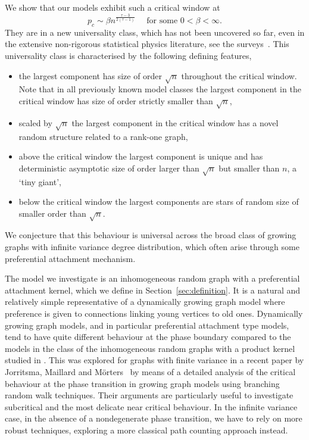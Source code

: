 \documentclass[12pt,a4paper]{article}
\numberwithin{equation}{section}
\begin{document}
We show that our models exhibit such a critical window at 
$$p_c \sim \beta n^{\frac{\tau-3}{2(\tau-1)}} \quad\text{ for some $0<\beta<\infty$.}$$ 
They are in a new %
universality class, which has not been uncovered so far, 
even in the extensive non-rigorous statistical physics literature, see the surveys~\cite{DoGo07, Li}. This universality class is characterised by the following defining features,
\begin{itemize}
    \item the largest component has size of order $\sqrt{n}$ throughout the critical window. Note that in all previously known model classes the largest component in the critical window has size of order strictly smaller than $\sqrt{n}$,
    \item scaled by $\sqrt{n}$ the largest component in the critical window has a novel random structure related to a 
    rank-one graph,
    \item above the critical window the largest component is unique and has deterministic asymptotic size of order 
    larger than $\sqrt{n}$ but smaller than $n$, a
    `tiny giant',
    \item below the critical window the largest components are stars of random size of smaller order
    than $\sqrt{n}$.
\end{itemize}
We conjecture that this  behaviour is universal across 
the broad class of growing graphs 
with infinite variance degree distribution, which often arise through some preferential attachment mechanism.\smallskip

The model  we investigate is an inhomogeneous random graph with a preferential attachment kernel, which we define in Section~\ref{sec:definition}. It is a natural and relatively simple representative of a 
dynamically growing graph model where preference is given to connections linking young vertices to old ones. Dynamically growing graph models, and in particular preferential attachment type models, tend to have quite different behaviour at the phase boundary compared to the models in the class of the inhomogeneous random graphs with a product kernel studied in \cite{BDH}.
This was explored for graphs with finite variance in a recent paper by Jorritsma, Maillard and M\"orters~\cite{JMM} by means of a detailed analysis of the critical behaviour at the phase transition in growing graph models using branching random walk techniques. Their arguments are particularly useful to investigate subcritical and the most delicate near critical behaviour. %
In the infinite variance case, in the absence of a nondegenerate phase transition,  we have to rely on more robust techniques, exploring a more classical path counting approach instead.
\smallskip
\end{document}
